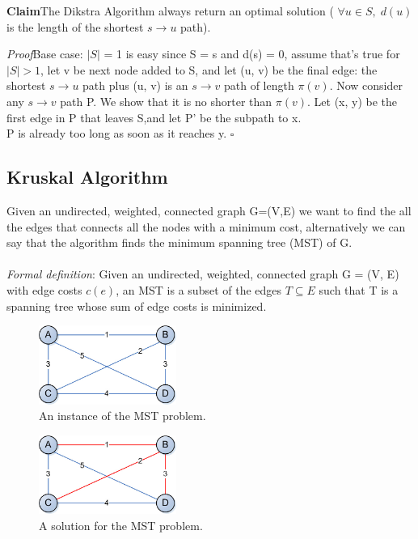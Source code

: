 \documentclass[11pt]{article}
\newenvironment{claim}[1]{\par\textbf{Claim}\space#1}{}
\newenvironment{proof}[1]{\\\par\textit{Proof}\space#1}{\hfill\ensuremath{\square}}
\begin{document}
\begin{claim}
The Dikstra Algorithm always return an optimal solution ( $\forall u \in S, \; d(u)$ is the length of the shortest $s\rightarrow u$ path).
\end{claim}
\begin{proof}
Base case: $| S |$ = 1 is easy since S = { s } and d(s) = 0, assume that's true for $| S | > 1$, let v be next node added to S, and let (u, v) be the final edge: the shortest $s\rightarrow u$ path plus (u, v) is an $s\rightarrow v$ path of length $π(v)$. Now consider any $s\rightarrow v$ path P. We show that it is no shorter than $π(v)$. Let (x, y) be the first edge in P that leaves S,and let P' be the subpath to x.\\
P is already too long as soon as it reaches y.
\end{proof}\\

\subsection{Kruskal Algorithm}
Given an undirected, weighted, connected graph G=(V,E) we want to find the all the edges that connects all the nodes with a minimum cost, alternatively we can say that the algorithm finds the minimum spanning tree (MST) of G.\\\\
\emph{Formal definition}: Given an undirected, weighted, connected  graph G = (V, E) with edge costs $c(e)$, an MST is a subset of the edges $T \subseteq E$ such that T is a spanning tree whose sum of edge costs is minimized.

\begin{figure}[H]
		\centering
		\includegraphics[width=0.4\textwidth ]{kruskal}
		\caption{An instance of the MST problem.}
\end{figure}

\begin{figure}[H]
		\centering
		\includegraphics[width=0.4\textwidth ]{kruskal_solved}
		\caption{A solution for the MST problem.}
\end{figure}
\end{document}

